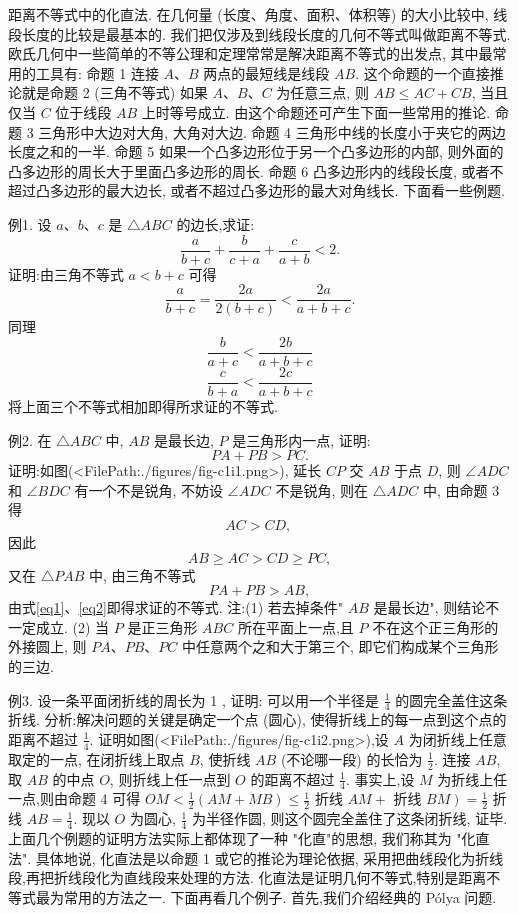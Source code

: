 
距离不等式中的化直法.
在几何量 (长度、角度、面积、体积等) 的大小比较中, 线段长度的比较是最基本的.
我们把仅涉及到线段长度的几何不等式叫做距离不等式.
欧氏几何中一些简单的不等公理和定理常常是解决距离不等式的出发点, 其中最常用的工具有:
命题 1 连接 $A 、 B$ 两点的最短线是线段 $A B$.
这个命题的一个直接推论就是命题 2 (三角不等式) 如果 $A 、 B 、 C$ 为任意三点, 则 $A B \leqslant A C+C B$, 当且仅当 $C$ 位于线段 $A B$ 上时等号成立.
由这个命题还可产生下面一些常用的推论.
命题 3 三角形中大边对大角, 大角对大边.
命题 4 三角形中线的长度小于夹它的两边长度之和的一半.
命题 5 如果一个凸多边形位于另一个凸多边形的内部, 则外面的凸多边形的周长大于里面凸多边形的周长.
命题 6 凸多边形内的线段长度, 或者不超过凸多边形的最大边长, 或者不超过凸多边形的最大对角线长.
下面看一些例题.



例1. 设 $a 、 b 、 c$ 是 $\triangle A B C$ 的边长,求证:
$$
\frac{a}{b+c}+\frac{b}{c+a}+\frac{c}{a+b}<2 .
$$
证明:由三角不等式 $a<b+c$ 可得
$$
\frac{a}{b+c}=\frac{2 a}{2(b+c)}<\frac{2 a}{a+b+c} .
$$
同理
$$
\frac{b}{a+c}<\frac{2 b}{a+b+c}
$$
$$
\frac{c}{b+a}<\frac{2 c}{a+b+c}
$$
将上面三个不等式相加即得所求证的不等式.



例2. 在 $\triangle A B C$ 中, $A B$ 是最长边, $P$ 是三角形内一点, 证明:
$$
P A+P B>P C .
$$
证明:如图(<FilePath:./figures/fig-c1i1.png>), 延长 $C P$ 交 $A B$ 于点 $D$, 则 $\angle A D C$ 和 $\angle B D C$ 有一个不是锐角, 不妨设 $\angle A D C$ 不是锐角, 则在 $\triangle A D C$ 中, 由命题 3 得
$$
A C>C D \text {, }
$$
因此
$$
A B \geqslant A C>C D \geqslant P C, \label{eq1}
$$
又在 $\triangle P A B$ 中, 由三角不等式
$$
P A+P B>A B, \label{eq2}
$$
由式\ref{eq1}、\ref{eq2}即得求证的不等式.
注:(1) 若去掉条件" $A B$ 是最长边", 则结论不一定成立.
(2) 当 $P$ 是正三角形 $A B C$ 所在平面上一点,且 $P$ 不在这个正三角形的外接圆上, 则 $P A 、 P B 、 P C$ 中任意两个之和大于第三个, 即它们构成某个三角形的三边.



例3. 设一条平面闭折线的周长为 1 , 证明: 可以用一个半径是 $\frac{1}{4}$ 的圆完全盖住这条折线.
分析:解决问题的关键是确定一个点 (圆心), 使得折线上的每一点到这个点的距离不超过 $\frac{1}{4}$.
证明如图(<FilePath:./figures/fig-c1i2.png>),设 $A$ 为闭折线上任意取定的一点, 在闭折线上取点 $B$, 使折线 $A B$ (不论哪一段) 的长恰为 $\frac{1}{2}$. 连接 $A B$, 取 $A B$ 的中点 $O$, 则折线上任一点到 $O$ 的距离不超过 $\frac{1}{4}$.
事实上,设 $M$ 为折线上任一点,则由命题 4 可得
$O M<\frac{1}{2}(A M+M B) \leqslant \frac{1}{2}$ 折线 $A M+$ 折线 $\left.B M\right)=\frac{1}{2}$ 折线 $A B=\frac{1}{4}$.
现以 $O$ 为圆心, $\frac{1}{4}$ 为半径作圆, 则这个圆完全盖住了这条闭折线, 证毕.
上面几个例题的证明方法实际上都体现了一种 "化直"的思想, 我们称其为 "化直法". 具体地说, 化直法是以命题 1 或它的推论为理论依据, 采用把曲线段化为折线段,再把折线段化为直线段来处理的方法.
化直法是证明几何不等式,特别是距离不等式最为常用的方法之一.
下面再看几个例子.
首先,我们介绍经典的 Pólya 问题.



